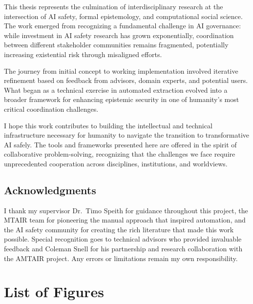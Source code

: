 \documentclass[
  11pt,
  letterpaper,
]{book}
\begin{document}
This thesis represents the culmination of interdisciplinary research at
the intersection of AI safety, formal epistemology, and computational
social science. The work emerged from recognizing a fundamental
challenge in AI governance: while investment in AI safety research has
grown exponentially, coordination between different stakeholder
communities remains fragmented, potentially increasing existential risk
through misaligned efforts.

The journey from initial concept to working implementation involved
iterative refinement based on feedback from advisors, domain experts,
and potential users. What began as a technical exercise in automated
extraction evolved into a broader framework for enhancing epistemic
security in one of humanity's most critical coordination challenges.

I hope this work contributes to building the intellectual and technical
infrastructure necessary for humanity to navigate the transition to
transformative AI safely. The tools and frameworks presented here are
offered in the spirit of collaborative problem-solving, recognizing that
the challenges we face require unprecedented cooperation across
disciplines, institutions, and worldviews.

\section*{Acknowledgments}\label{acknowledgments-1}


I thank my supervisor Dr.~Timo Speith for guidance throughout this
project, the MTAIR team for pioneering the manual approach that inspired
automation, and the AI safety community for creating the rich literature
that made this work possible. Special recognition goes to technical
advisors who provided invaluable feedback and Coleman Snell for his
partnership and research collaboration with the AMTAIR project. Any
errors or limitations remain my own responsibility.


\chapter*{List of Figures}\label{list-of-figures}

\end{document}
